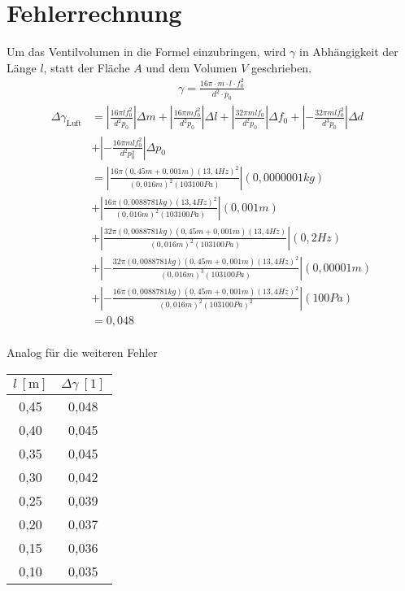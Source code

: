 \chapter{Fehlerrechnung}
	Um das Ventilvolumen in die Formel einzubringen, wird $\gamma$ in Abhängigkeit der Länge $l$, statt der Fläche $A$ und dem Volumen $V$ geschrieben.
      \begin{align*}
     		\gamma = \frac{16 \pi \cdot m \cdot l \cdot f_0^2}{d^2 \cdot p_0}
      \end{align*}
      \begin{align*}
     		\Delta\gamma_{\text{Luft}} &= 
            \left| \frac{16\pi l f_0^2}{d^2 p_0}\right| \Delta m + 
            \left| \frac{16\pi m f_0^2}{d^2 p_0}\right| \Delta l + 
            \left| \frac{32\pi m l f_0}{d^2 p_0}\right| \Delta f_0 + 
            \left| -\frac{32 \pi m l f_0^2}{d^3 p_0}\right| \Delta d \\&+ 
            \left| -\frac{16 \pi m l f_0^2}{d^2 p_0^2}\right| \Delta p_0 \\&=
            \left| \frac{16\pi (0,45m + 0,001m) (13,4Hz)^2}{(0,016m)^2 (103100Pa)}\right| (0,0000001kg)\\ &+ 
            \left| \frac{16\pi (0,0088781kg) (13,4Hz)^2}{(0,016m)^2 (103100Pa)}\right| (0,001m) \\ &+ 
            \left| \frac{32\pi (0,0088781kg) (0,45m + 0,001m) (13,4Hz)}{(0,016m)^2 (103100Pa)}\right| (0,2Hz) \\ &+ 
            \left| -\frac{32 \pi (0,0088781kg) (0,45m + 0,001m) (13,4Hz)^2}{(0,016m)^3 (103100Pa)}\right| (0,00001m)\\&+ 
            \left| -\frac{16 \pi (0,0088781kg) (0,45m + 0,001m) (13,4Hz)^2}{(0,016m)^2 (103100Pa)^2}\right| (100Pa) \\ &= 0,048
      \end{align*} \\
      
      Analog für die weiteren Fehler
      \begin{center}
      \begin{tabular}{c|c}
$l ~[\text{m}]$ & $\Delta\gamma ~[1]$    \\ \hline
0,45         & 0,048 \\
0,40          & 0,045\\
0,35         & 0,045 \\
0,30          & 0,042 \\
0,25         & 0,039 \\
0,20          & 0,037 \\
0,15         & 0,036 \\
0,10          & 0,035	
		\end{tabular}
	\end{center}
      
